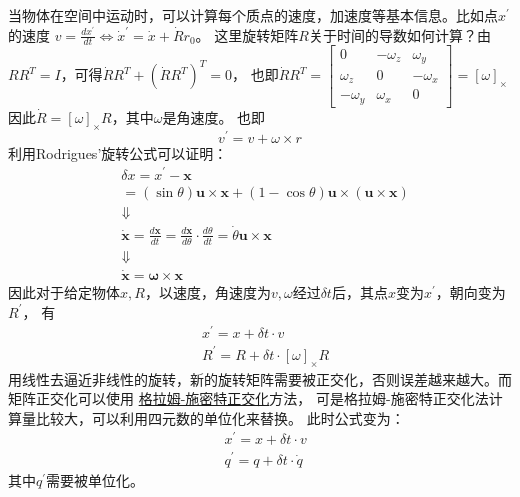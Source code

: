 \documentclass[lang=cn,newtx,10pt,scheme=chinese]{elegantbook}
\begin{document}
当物体在空间中运动时，可以计算每个质点的速度，加速度等基本信息。比如点$x^\prime$的速度
$v=\frac{d x^{\prime}}{d t} \Leftrightarrow \dot{x}^{\prime}=\dot{x}+\dot{R} r_0$。
这里旋转矩阵$R$关于时间的导数如何计算？由$RR^T = I$，可得$\dot{R}R^T + (\dot{R}R^T)^T=0$，
也即$\dot{R}R^T=\left[\begin{array}{ccc}
  0 & -\omega_z & \omega_y \\
  \omega_z & 0 & -\omega_x \\
  -\omega_y & \omega_x & 0
  \end{array}\right]=[\omega]_{\times}$
因此$\dot{R}=[\omega]_{\times}R$，其中$\omega$是角速度。
也即
\begin{equation}
  \label{dv:dt}
  v^{\prime}=v + \omega\times r
\end{equation}
利用Rodrigues'旋转公式可以证明：
\begin{equation}
  \begin{aligned}
  & \delta x= x^{\prime}-\boldsymbol{x} \\
  &=(\sin \theta) \boldsymbol{u} \times \boldsymbol{x}+(1-\cos \theta) \boldsymbol{u} \times(\boldsymbol{u} \times \boldsymbol{x}) \\
  & \Downarrow \\
  & \dot{\boldsymbol{x}}=\frac{d \boldsymbol{x}}{d t}= \frac{d \boldsymbol{x}}{d \theta} \cdot \frac{d \theta}{d t}=\dot{\theta} \boldsymbol{u} \times \boldsymbol{x} \\
  & \Downarrow \\
  &\dot{\boldsymbol{x}}=\boldsymbol{\omega} \times \boldsymbol{x}
  \end{aligned}
\end{equation}
因此对于给定物体$x, R$，以速度，角速度为$v, \omega$经过$\delta t$后，其点$x$变为$x^\prime$，朝向变为$R^\prime$，
有
\begin{equation}
  \begin{aligned}
  & x^{\prime}=x+\delta t \cdot v \\
  & R^{\prime}=R+\delta t \cdot[\omega]_{\times} R
  \end{aligned}
\end{equation}
用线性去逼近非线性的旋转，新的旋转矩阵需要被正交化，否则误差越来越大。而矩阵正交化可以使用
\href{https://en.wikipedia.org/wiki/Gram%E2%80%93Schmidt_process}{格拉姆-施密特正交化}方法，
可是格拉姆-施密特正交化法计算量比较大，可以利用四元数的单位化来替换。
此时公式变为：
\begin{equation}
  \begin{aligned}
  & x^{\prime}=x+\delta t \cdot v \\
  & q^{\prime}=q+\delta t \cdot\dot{q}
  \end{aligned}
\end{equation}其中$q^{\prime}$需要被单位化。
\end{document}
